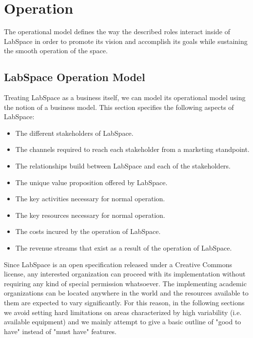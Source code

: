 \documentclass[a4paper, 11pt]{article}
\begin{document}
\section{Operation}

The operational model defines the way the described roles interact inside of LabSpace in order to promote its vision and accomplish its goals while sustaining the smooth operation of the space.

\subsection{LabSpace Operation Model}

Treating LabSpace as a business itself, we can model its operational model using the notion of a business model. This section specifies the following aspects of LabSpace:

\begin{itemize}[noitemsep]
    \item The different stakeholders of LabSpace.
    \item The channels required to reach each stakeholder from a marketing standpoint.
    \item The relationships build between LabSpace and each of the stakeholders.
    \item The unique value proposition offered by LabSpace.
    \item The key activities necessary for normal operation.
    \item The key resources necessary for normal operation.
    \item The costs incured by the operation of LabSpace.
    \item The revenue streams that exist as a result of the operation of LabSpace.
\end{itemize}

Since LabSpace is an open specification released under a Creative Commons license, any interested organization can proceed with its implementation without requiring any kind of special permission whatsoever. The implementing academic organizations can be located anywhere in the world and the resources available to them are expected to vary significantly. For this reason, in the following sections we avoid setting hard limitations on areas characterized by high variability (i.e. available equipment) and we mainly attempt to give a basic outline of "good to have" instead of "must have" features.
\end{document}
